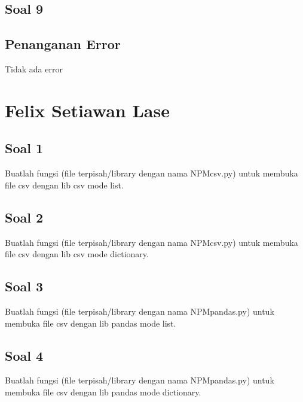 \subsection{Soal 9}


\subsection{Penanganan Error}
Tidak ada error
\section{Felix Setiawan Lase}
\subsection{Soal 1}
Buatlah  fungsi  (file  terpisah/library  dengan  nama  NPMcsv.py)  untuk  membuka file csv dengan lib csv mode list.



\subsection{Soal 2}
Buatlah  fungsi  (file  terpisah/library  dengan  nama  NPMcsv.py)  untuk  membuka file csv dengan lib csv mode dictionary.



\subsection{Soal 3}
Buatlah fungsi (file terpisah/library dengan nama NPMpandas.py) untuk membuka file csv dengan lib pandas mode list.



\subsection{Soal 4}
Buatlah fungsi (file terpisah/library dengan nama NPMpandas.py) untuk membuka file csv dengan lib pandas mode dictionary.

